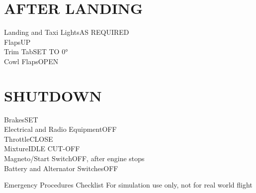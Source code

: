 \documentclass{article}
\begin{document}
\begin{multicols*}{2}
\section*{AFTER LANDING}
Landing and Taxi Lights\dotfill AS REQUIRED\\
Flaps\dotfill UP\\
Trim Tab\dotfill SET TO 0°\\
Cowl Flaps\dotfill OPEN
\section*{SHUTDOWN}
Brakes\dotfill SET\\
Electrical and Radio Equipment\dotfill OFF\\
Throttle\dotfill CLOSE\\
Mixture\dotfill IDLE CUT-OFF\\
Magneto/Start Switch\dotfill OFF, after engine stops\\
Battery and Alternator Switches\dotfill OFF\\
\end{multicols*}
\newpage
\begin{center}
    {\fontsize{20.74}{70}\selectfont Emergency Procedures Checklist}
    \break
    \color{Red}
    {\fontsize{10}{70}\selectfont For simulation use only, not for real world flight}
\end{center}
\vspace*{-2em}
\end{document}
